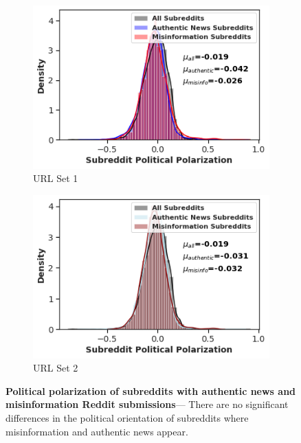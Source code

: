\begin{figure}
\begin{subfigure}{.4\textwidth}
  \centering
\includegraphics[width=1\linewidth]{figures/subreddit_political_comparison.png}
    \caption{URL Set 1}
\label{fig:harmonic-sub1}
\end{subfigure}%
\begin{subfigure}{.4\textwidth}
  \centering
\includegraphics[width=1\linewidth]{figures/subreddit_political_comparison2.png}
    \caption{URL Set 2}
  \label{fig:pagerank-sub2}
\end{subfigure}

\caption{\textbf{Political polarization of subreddits with authentic news and misinformation Reddit submissions}--- There are no significant differences in the political orientation of subreddits where misinformation and authentic news appear. }
\label{fig:subreddit-misinformation-authentic-toxicity}
\end{figure}
